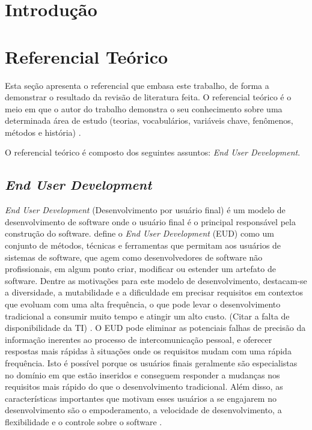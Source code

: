 \chapter[Introdução]{Introdução}

\chapter[Referencial Teórico]{Referencial Teórico}

Esta seção apresenta o referencial que embasa este trabalho, de forma a demonstrar o resultado da revisão de literatura feita. O referencial teórico é o meio em que o autor do trabalho demonstra o seu conhecimento sobre uma determinada área de estudo (teorias, vocabulários, variáveis chave, fenômenos, métodos e história) \cite{randolph2009}.

O referencial teórico é composto dos seguintes assuntos: \textit{End User Development}.


\section{\textit{End User Development}}

\textit{End User Development} (Desenvolvimento por usuário final) é um modelo de desenvolvimento de software onde o usuário final é o principal responsável pela construção do software.  define o \textit{End User Development} (EUD) como um conjunto de métodos, técnicas e ferramentas que permitam aos usuários de sistemas de software, que agem como desenvolvedores de software não profissionais, em algum ponto criar, modificar ou estender um artefato de software. Dentre as motivações para este modelo de desenvolvimento, destacam-se a diversidade, a mutabilidade e a dificuldade em precisar requisitos em contextos que evoluam com uma alta frequência, o que pode levar o desenvolvimento tradicional a consumir muito tempo e atingir um alto custo. (Citar a falta de disponibilidade da TI) \cite{lieberman2006}. O EUD pode eliminar as potenciais falhas de precisão da informação inerentes ao processo de intercomunicação pessoal, e oferecer respostas mais rápidas à situações onde os requisitos mudam com uma rápida frequência. Isto é possível porque os usuários finais geralmente são especialistas no domínio em que estão inseridos e conseguem responder a mudanças nos requisitos mais rápido do que o desenvolvimento tradicional. Além disso, as características importantes que motivam esses usuários a se engajarem no desenvolvimento são o empoderamento, a velocidade de desenvolvimento, a flexibilidade e o controle sobre o software \cite{fischer2004}.

